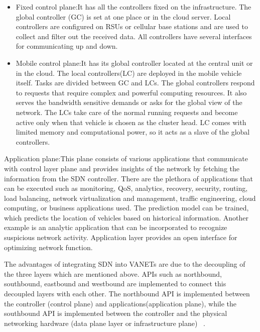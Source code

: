 \documentclass[
  oneside,
  11pt, a4paper,
  footinclude=true,
  headinclude=true,
  cleardoublepage=empty
]{scrbook}
\begin{document}
\begin{itemize}
    \item Fixed control plane:It has all the controllers fixed on the infrastructure. The global controller (GC) is set at one place or in the cloud server. Local controllers are configured on RSUs or cellular base stations and are used to collect and filter out the received data. All controllers have several interfaces for communicating up and down.
    \item Mobile control plane:It has its global controller located at the central unit or in the cloud. The local controllers(LC) are deployed in the mobile vehicle itself. Tasks are divided between GC and LCs. The global controllers respond to requests that require complex and powerful computing resources. It also serves the bandwidth sensitive demands or asks for the global view of the network. The LCs take care of the normal running requests and become active only when that vehicle is chosen as the cluster head. LC comes with limited memory and computational power, so it acts as a slave of the global controllers.
\end{itemize}\par

 Application plane:This plane consists of various applications that communicate with control layer plane and provides insights of the network by fetching the information from the SDN controller. There are the plethora of applications that can be executed such as monitoring, QoS, analytics, recovery, security, routing, load balancing, network virtualization and management, traffic engineering, cloud computing, or business applications used. The prediction model can be trained, which predicts the location of vehicles based on historical information. Another example is an analytic application that can be incorporated to recognize suspicious network activity. Application layer provides an open interface for optimizing network function.\par
 The advantages of integrating SDN into VANETs are due to the decoupling of the three layers which are mentioned above. APIs such as northbound, southbound, eastbound and westbound are implemented to connect this decoupled layers with each other. The northbound API is implemented between the controller (control plane) and applications(application plane), while the southbound API is implemented between the controller and the physical networking hardware (data plane layer or infrastructure plane) ~\cite{Bhatia2019sdvn}.
\end{document}
